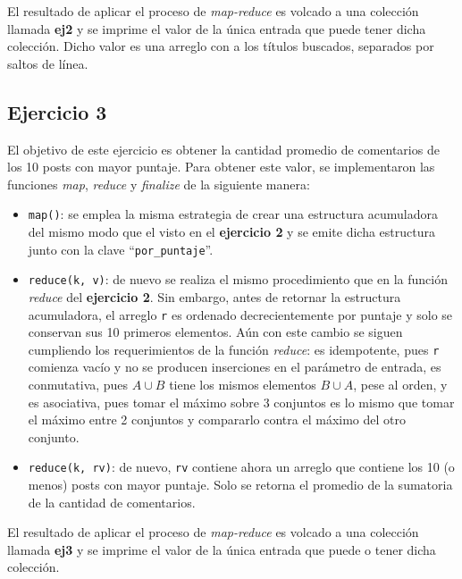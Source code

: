 \documentclass[a4paper]{article}
\begin{document}
El resultado de aplicar el proceso de \textit{map-reduce} es volcado a una
colección llamada \textbf{ej2} y se imprime el valor de la única entrada que
puede tener dicha colección. Dicho valor es una arreglo con a los títulos
buscados, separados por saltos de línea.

\subsection{Ejercicio 3}
El objetivo de este ejercicio es obtener la cantidad promedio de comentarios de
los 10 posts con mayor puntaje. Para obtener este valor, se implementaron las
funciones \textit{map}, \textit{reduce} y \textit{finalize} de la siguiente
manera:
\begin{itemize}
  \item \verb|map()|: se emplea la misma estrategia de crear una estructura
  acumuladora del mismo modo que el visto en el \textbf{ejercicio 2} y se emite
  dicha estructura junto con la clave ``\verb|por_puntaje|''.
  \item \verb|reduce(k, v)|: de nuevo se realiza el mismo procedimiento que en
  la función \textit{reduce} del \textbf{ejercicio 2}. Sin embargo, antes de
  retornar la estructura acumuladora, el arreglo \verb|r| es ordenado
  decrecientemente por puntaje y solo se conservan sus 10 primeros elementos.
  Aún con este cambio se siguen cumpliendo los requerimientos de la función
  \textit{reduce}: es idempotente, pues \verb|r| comienza vacío y no se
  producen inserciones en el parámetro de entrada, es conmutativa, pues $A \cup
  B$ tiene los mismos elementos $B \cup A$, pese al orden, y es asociativa,
  pues tomar el máximo sobre 3 conjuntos es lo mismo que tomar el máximo entre
  2 conjuntos y compararlo contra el máximo del otro conjunto.
  \item \verb|reduce(k, rv)|: de nuevo, \verb|rv| contiene ahora un arreglo que
  contiene los 10 (o menos) posts con mayor puntaje. Solo se retorna el
  promedio de la sumatoria de la cantidad de comentarios.
\end{itemize}

El resultado de aplicar el proceso de \textit{map-reduce} es volcado a una
colección llamada \textbf{ej3} y se imprime el valor de la única entrada que
puede o tener dicha colección.
\end{document}
